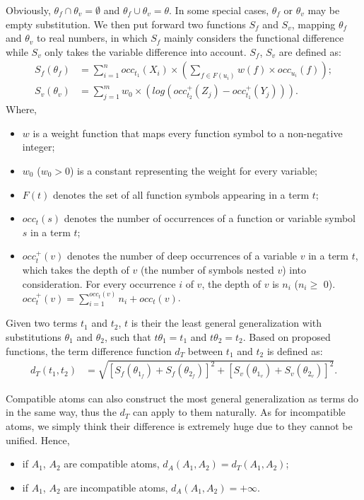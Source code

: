 \documentclass[EPiC]{easychair}
\begin{document}
Obviously, $\theta_f\cap\theta_v =\emptyset$ and 
$\theta_f\cup\theta_v = \theta$. 
In some special cases, $\theta_f$ or $\theta_v$ may be empty substitution. 
We then put forward two functions $S_f$ and $S_v$, mapping $\theta_f$ and 
$\theta_v$ to real numbers, in which $S_f$ mainly considers the functional 
difference while $S_v$ only takes the variable difference into account. 
$S_f$, $S_v$ are defined as: 
	\begin{align}
		S_{f}(\theta_{f}) &= \sum_{i=1}^{n}occ_{t_1}(X_i)\times(\sum_{f\in F(u_i)}w(f)\times occ_{u_i}(f)); \\
		S_{v}(\theta_{v}) &=\sum_{j=1}^{m}w_{0}\times(log(occ_{t_2}^{+}(Z_{j})-occ_{t_1}^{+}(Y_{j}))).
	\end{align}
Where,
\begin{itemize}
\item $w$ is a weight function that maps every function symbol to a 
      non-negative integer;
\item $w_0$ ($w_0 > 0$) is a constant representing the weight for every 
      variable;
\item $F(t)$ denotes the set of all function symbols appearing in a term $t$;
\item $occ_{t}(s)$ denotes the number of occurrences of a function or variable 
      symbol $s$ in a term $t$;
\item $occ_{t}^{+}(v)$ denotes the number of deep occurrences of a variable 
      $v$ in a term $t$, which takes the depth of $v$ (the number of symbols 
      nested $v$) into consideration. 
      For every occurrence $i$ of $v$, the depth of $v$ is $n_i$ ($n_i\geq$ 0). 
      $occ_{t}^{+}(v)=\sum_{i=1}^{occ_{t}(v)}n_i+occ_{t}(v)$.
\end{itemize}

Given two terms $t_1$ and $t_2$, $t$ is their the least general generalization 
with substitutions $\theta_1$ and $\theta_2$, such that $t\theta_1=t_1$ and 
$t\theta_2=t_2$. 
Based on proposed functions, the term difference function $d_T$ between 
$t_1$ and $t_2$ is defined as:
\begin{align}
	d_T(t_1, t_2) & = \sqrt{[S_f(\theta_{1_{f}})+S_f(\theta_{2_{f}})]^2+[S_v(\theta_{1_{v}})+S_v(\theta_{2_{v}})]^2}.
\end{align}

Compatible atoms can also construct the most general generalization as terms 
do in the same way, thus the $d_T$ can apply to them naturally. 
As for incompatible atoms, we simply think their difference is extremely 
huge due to they cannot be unified. Hence,
\begin{itemize}
	\item if $A_1$, $A_2$ are compatible atoms, $d_A(A_1,A_2)=d_T(A_1, A_2)$;
	\item if $A_1$, $A_2$ are incompatible atoms, $d_A(A_1,A_2)=+\infty$.
\end{itemize}
\end{document}
